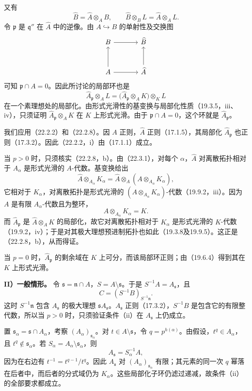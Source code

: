 又有
\[
 \widehat B=\widehat A\otimes_A B,
 \qquad\widehat B\otimes_B L=\widehat A\otimes_A L.
\]
令 $\mathfrak p$ 是 $\mathfrak q''$ 在 $\widehat A$ 中的逆像。由 $A\hookrightarrow B$ 的单射性及交换图
\[
\begin{tikzcd}[column sep=large,row sep=large]
 B\arrow[r]&\widehat B\\
 A\arrow[u]\arrow[r]&\widehat A\arrow[u]
\end{tikzcd}
\]
可知 $\mathfrak p\cap A=0$。因此所讨论的局部环也是
\[
 \widehat A_{\mathfrak p}\otimes_A L
 =\bigl(\widehat A_{\mathfrak p}\otimes_A K\bigr)\otimes_K L
\]
在一个素理想处的局部化。由形式光滑性的基变换与局部化性质（19.3.5，iii、iv），只须证明 $\widehat A_{\mathfrak p}\otimes_A K$ 在 $K$ 上形式光滑。由于 $\mathfrak p\cap A=0$，这个环就是 $\widehat A_{\mathfrak p}$。

我们应用（22.2.2）和（22.2.8）。因 $A$ 正则，$\widehat A$ 正则（17.1.5），其局部化 $\widehat A_{\mathfrak p}$ 也正则（17.3.2）。因此（22.2.2，i）由（17.1.1）成立。

当 $p>0$ 时，只须核实（22.2.8，b）。由（22.3.1），对每个 $\alpha$，$\widehat A$ 对离散拓扑相对于 $A_\alpha$ 是形式光滑的 $A$-代数。基变换给出
\[
 \widehat A\otimes_{A_\alpha}K_\alpha
 =\widehat A\otimes_A(A\otimes_{A_\alpha}K_\alpha),
\]
它相对于 $K_\alpha$，对离散拓扑是形式光滑的 $(A\otimes_{A_\alpha}K_\alpha)$-代数（19.9.2，iii）。因为 $A$ 是有限 $A_\alpha$-代数且为整环，
\[
 A\otimes_{A_\alpha}K_\alpha=K.
\]
而 $\widehat A_{\mathfrak p}$ 是 $\widehat A\otimes_A K$ 的局部化，故它对离散拓扑相对于 $K_\alpha$ 是形式光滑的 $K$-代数（19.9.2，iv）；于是对其极大理想预进制拓扑也如此（19.3.8及19.9.5）。这正是（22.2.8，b），从而得证。

当 $p=0$ 时，$\widehat A_{\mathfrak p}$ 的剩余域在 $K$ 上可分，而该局部环正则；由（19.6.4）得到其在 $K$ 上形式光滑。

\noindent\textbf{II）一般情形。}
令 $\mathfrak s=\mathfrak n\cap A$，$S=A\setminus\mathfrak s$。于是 $S^{-1}A=A_{\mathfrak s}$，且
\[
 C=(S^{-1}B)_{S^{-1}\mathfrak n}.
\]
这时 $S^{-1}\mathfrak n$ 包含 $A_{\mathfrak s}$ 的极大理想 $\mathfrak sA_{\mathfrak s}$。$A_{\mathfrak s}$ 正则（17.3.2），$S^{-1}B$ 是包含它的有限整代数，所以当 $p>0$ 时，只须验证条件（ii）在 $A_{\mathfrak s}$ 上仍成立。

置 $\mathfrak s_\alpha=\mathfrak s\cap A_\alpha$，考察 $(A_\alpha)_{\mathfrak s_\alpha}$。对 $t\in A\setminus\mathfrak s$，令 $q=p^{h(\alpha)}$。由假设，$t^q\in A_\alpha$，且 $t^q\notin\mathfrak s_\alpha$。若 $S_\alpha=A_\alpha\setminus\mathfrak s_\alpha$，则
\[
 A_{\mathfrak s}=S_\alpha^{-1}A,
\]
因为在右边有 $t^{-1}=t^{q-1}/t^q$。因此 $A_{\mathfrak s}$ 对 $(A_\alpha)_{\mathfrak s_\alpha}$ 有限；其元素的同一次 $q$ 幂落在后者中，而后者的分式域仍为 $K_\alpha$。这些局部化子环仍滤过递减，故条件（ii）的全部要求都成立。
\finishproof


